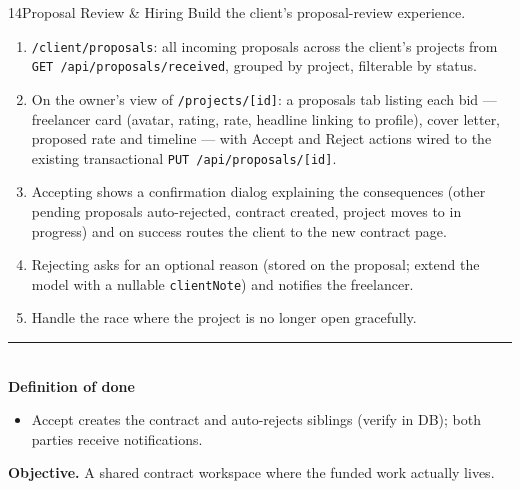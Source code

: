 \documentclass[11pt,a4paper]{article}
\newcommand{\dod}{\medskip\noindent\textcolor{donegreen}{\rule{\linewidth}{0.5pt}}\\[1mm]\textbf{\textcolor{donegreen}{Definition of done}}\\[-2mm]}
\newcommand{\objective}[1]{\noindent\textbf{Objective.} #1\medskip}
\begin{document}
\begin{promptbox}{14}{Proposal Review \& Hiring}
Build the client's proposal-review experience.

\begin{enumerate}[leftmargin=1.6em]
  \item \texttt{/client/proposals}: all incoming proposals across the client's
        projects from \texttt{GET /api/proposals/received}, grouped by project,
        filterable by status.
  \item On the owner's view of \texttt{/projects/[id]}: a proposals tab listing each
        bid --- freelancer card (avatar, rating, rate, headline linking to profile),
        cover letter, proposed rate and timeline --- with Accept and Reject actions
        wired to the existing transactional \texttt{PUT /api/proposals/[id]}.
  \item Accepting shows a confirmation dialog explaining the consequences (other
        pending proposals auto-rejected, contract created, project moves to in
        progress) and on success routes the client to the new contract page.
  \item Rejecting asks for an optional reason (stored on the proposal; extend the
        model with a nullable \texttt{clientNote}) and notifies the freelancer.
  \item Handle the race where the project is no longer open gracefully.
\end{enumerate}

\dod
\begin{itemize}[leftmargin=1.6em]
  \item Accept creates the contract and auto-rejects siblings (verify in DB);
        both parties receive notifications.
\end{itemize}
\end{promptbox}

\objective{A shared contract workspace where the funded work actually lives.}
\end{document}
